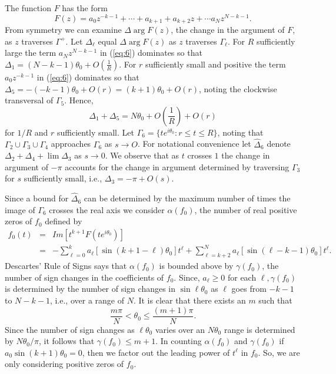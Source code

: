 The function $F$ has the form \begin{equation} F(z) = a_0 z^{-k-1} +
\cdots + a_{k+1} + a_{k+2} z + \cdots a_N
z^{N-k-1}.\label{eq:6}\end{equation} From symmetry we can examine
$\Delta \arg F(z)$, the change in the argument of $F$, as $z$
traverses $\Gamma^+$.  Let $\Delta_\ell$ equal $\Delta \arg F(z)$ as
$z$ traverses $\Gamma_\ell$.  For $R$ sufficiently large the term
$a_N z^{N-k-1}$ in (\ref{eq:6}) dominates so that $\Delta_1 = (N-k-1)
\theta_0 +O (\frac{1}{R})$.  For $r$ sufficiently small and positive
the term $a_0 z^{-k-1}$ in (\ref{eq:6}) dominates so that $\Delta_5 =
-(-k-1) \theta_0 + O(r) = (k+1) \theta_0 + O(r)$, noting the
clockwise transversal of $\Gamma_5$.  Hence, \begin{equation}
\Delta_1 + \Delta_5 = N\theta_0 + O \left(\frac{1}{R}\right) +
O(r)\label{eq:7}\end{equation} for $1/R$ and $r$ sufficiently small.
Let $\Gamma_6 = \{t e^{i\theta_0}: r \leq t \leq R\}$, noting that
$\Gamma_2 \cup \Gamma_3 \cup \Gamma_4$ approaches $\Gamma_6$ as $s
\rightarrow O$.  For notational convenience let $\hat{\Delta}_6$
denote $\Delta_2+\Delta_4 +\lim \Delta_3$ as $s\rightarrow0$.  We observe that as $t$ crosses $1$ the change in
argument of $-\pi$ accounts for the change in argument determined by
traversing $\Gamma_3$ for $s$ sufficiently small, i.e., $\Delta_3 =
-\pi + O(s)$.  

Since a bound for $\hat{\Delta}_6$ can be determined by the
maximum number of times the image of $\Gamma_6$ crosses the real axis
we consider $\alpha(f_0)$, the number of real positive zeros of $f_0$
defined by \begin{eqnarray} f_0 (t) & = & Im \left[t^{k+1} F (te^{i
\theta_{0}}) \right]\label{eq:8}\\[2ex] & = & -\sum^k_{\ell=0}
a_\ell \left[\sin (k+1-\ell) \theta_0\right] t^\ell + \sum^N_{\ell =
k+2} a_\ell \left[\sin (\ell -k-1)\theta_0\right]
t^\ell\nonumber.\end{eqnarray} Descartes' Rule of Signs says that
$\alpha (f_0)$ is bounded above by $\gamma (f_0)$, the number of sign
changes in the coefficients of $f_0$.  Since, $a_\ell \geq 0$ for
each $\ell,\gamma(f_0)$ is determined by the number of sign changes
in $\sin \ell\theta_0$ as $\ell$ goes from $-k-1$ to $N-k-1$, i.e.,
over a range of $N$.  It is clear that there exists an $m$ such that
\begin{equation} \frac{m\pi}{N} < \theta_0 \leq \frac{(m+1)\pi}{N}.\label{eq:9}\end{equation} Since the number of sign changes as
$\ell\theta_0$ varies over an $N \theta_0$ range is determined by
$N\theta_0 /\pi$, it follows that $\gamma (f_0) \leq m+1$.  In
counting $\alpha(f_0)$ and  $\gamma(f_0)$ if $a_0 \sin(k+1)\theta_0 = 0$, then we factor out the leading power of $t^\ell$ in $f_0$.  So,
we are only considering positive zeros of $f_0$.

